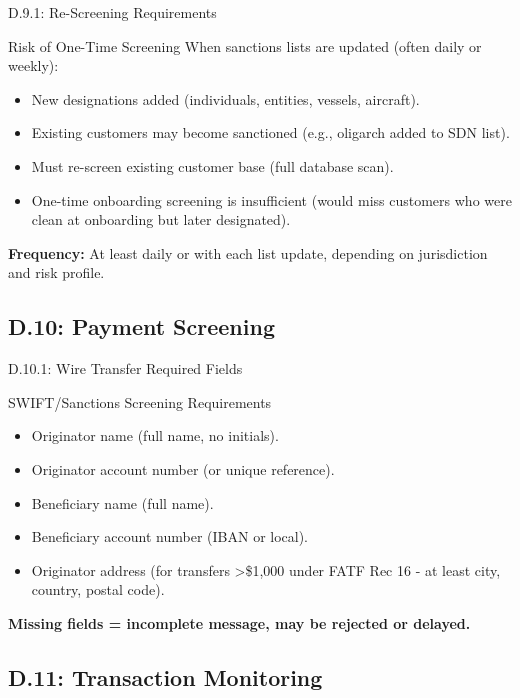 \documentclass{beamer}
\begin{document}
	\begin{frame}{D.9.1: Re-Screening Requirements}
		\begin{block}{Risk of One-Time Screening}
			When sanctions lists are updated (often daily or weekly):
			\begin{itemize}
				\item New designations added (individuals, entities, vessels, aircraft).
				\item Existing customers may become sanctioned (e.g., oligarch added to SDN list).
				\item Must re-screen existing customer base (full database scan).
				\item One-time onboarding screening is insufficient (would miss customers who were clean at onboarding but later designated).
			\end{itemize}
		\end{block}
		\textbf{Frequency:} At least daily or with each list update, depending on jurisdiction and risk profile.
	\end{frame}
	
	\subsection{D.10: Payment Screening}
	
	\begin{frame}{D.10.1: Wire Transfer Required Fields}
		\begin{block}{SWIFT/Sanctions Screening Requirements}
			\begin{itemize}
				\item Originator name (full name, no initials).
				\item Originator account number (or unique reference).
				\item Beneficiary name (full name).
				\item Beneficiary account number (IBAN or local).
				\item Originator address (for transfers >\$1,000 under FATF Rec 16 - at least city, country, postal code).
			\end{itemize}
		\end{block}
		\textbf{Missing fields = incomplete message, may be rejected or delayed.}
	\end{frame}
	
	\subsection{D.11: Transaction Monitoring}
	
\end{document}
